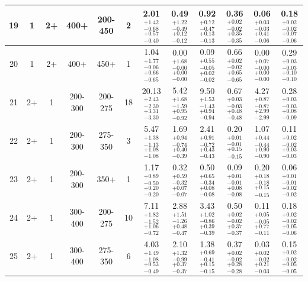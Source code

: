 \begin{landscape}
\begin{table}[hp]
\begin{lrbox}{\resBox}
\begin{tabular}{|c|c|c|c|c||c|c||c|c|c|c|c|}
 \hline
             19 &               1 &              2+ &            400+ &         200-450  &      2 &   2.01 $^{+1.42}_{-0.68}$ $^{+0.57}_{-0.40}$ &   0.49 $^{+1.22}_{-0.49}$ $^{+0.12}_{-0.12}$ &   0.92 $^{+0.72}_{-0.47}$ $^{+0.13}_{-0.13}$ &   0.36 $^{+0.02}_{-0.02}$ $^{+0.35}_{-0.35}$ &   0.06 $^{+0.03}_{-0.03}$ $^{+0.41}_{-0.06}$ &   0.18 $^{+0.02}_{-0.02}$ $^{+0.07}_{-0.06}$ \\
 \hline
             20 &               1 &              2+ &            400+ &            450+  &      1 &   1.04 $^{+1.77}_{-0.06}$ $^{+0.66}_{-0.65}$ &   0.00 $^{+1.68}_{-0.00}$ $^{+0.00}_{-0.00}$ &   0.09 $^{+0.55}_{-0.05}$ $^{+0.02}_{-0.02}$ &   0.66 $^{+0.02}_{-0.02}$ $^{+0.65}_{-0.65}$ &   0.00 $^{+0.07}_{-0.00}$ $^{+0.00}_{-0.00}$ &   0.29 $^{+0.03}_{-0.03}$ $^{+0.10}_{-0.10}$ \\
 \hline
             21 &              2+ &               1 &         200-300 &         200-275  &     18 &  20.13 $^{+2.43}_{-2.30}$ $^{+3.31}_{-3.30}$ &   5.42 $^{+1.68}_{-1.59}$ $^{+0.95}_{-0.92}$ &   9.50 $^{+1.53}_{-1.43}$ $^{+0.94}_{-0.94}$ &   0.67 $^{+0.03}_{-0.03}$ $^{+0.48}_{-0.48}$ &   4.27 $^{+0.87}_{-0.87}$ $^{+2.99}_{-2.99}$ &   0.28 $^{+0.03}_{-0.03}$ $^{+0.08}_{-0.09}$ \\
 \hline
             22 &              2+ &               1 &         200-300 &         275-350  &      3 &   5.47 $^{+1.38}_{-1.13}$ $^{+1.08}_{-1.08}$ &   1.69 $^{+0.94}_{-0.74}$ $^{+0.40}_{-0.39}$ &   2.41 $^{+0.91}_{-0.72}$ $^{+0.43}_{-0.43}$ &   0.20 $^{+0.01}_{-0.01}$ $^{+0.15}_{-0.15}$ &   1.07 $^{+0.44}_{-0.44}$ $^{+0.90}_{-0.90}$ &   0.11 $^{+0.02}_{-0.02}$ $^{+0.03}_{-0.03}$ \\
 \hline
             23 &              2+ &               1 &         200-300 &            350+  &      1 &   1.17 $^{+0.89}_{-0.50}$ $^{+0.20}_{-0.20}$ &   0.32 $^{+0.59}_{-0.32}$ $^{+0.07}_{-0.07}$ &   0.50 $^{+0.65}_{-0.34}$ $^{+0.08}_{-0.08}$ &   0.09 $^{+0.01}_{-0.01}$ $^{+0.08}_{-0.08}$ &   0.20 $^{+0.18}_{-0.18}$ $^{+0.15}_{-0.15}$ &   0.06 $^{+0.01}_{-0.01}$ $^{+0.02}_{-0.02}$ \\
 \hline
             24 &              2+ &               1 &         300-400 &         200-275  &     10 &   7.11 $^{+1.82}_{-1.52}$ $^{+1.06}_{-0.72}$ &   2.88 $^{+1.51}_{-1.26}$ $^{+0.48}_{-0.47}$ &   3.43 $^{+1.02}_{-0.86}$ $^{+0.39}_{-0.39}$ &   0.50 $^{+0.02}_{-0.02}$ $^{+0.37}_{-0.37}$ &   0.11 $^{+0.05}_{-0.05}$ $^{+0.77}_{-0.11}$ &   0.18 $^{+0.02}_{-0.02}$ $^{+0.05}_{-0.06}$ \\
 \hline
             25 &              2+ &               1 &         300-400 &         275-350  &      6 &   4.03 $^{+1.49}_{-1.08}$ $^{+0.53}_{-0.49}$ &   2.10 $^{+1.32}_{-0.99}$ $^{+0.37}_{-0.37}$ &   1.38 $^{+0.69}_{-0.41}$ $^{+0.15}_{-0.15}$ &   0.37 $^{+0.02}_{-0.02}$ $^{+0.28}_{-0.28}$ &   0.03 $^{+0.02}_{-0.02}$ $^{+0.21}_{-0.03}$ &   0.15 $^{+0.02}_{-0.02}$ $^{+0.05}_{-0.05}$ \\

\end{tabular}
\end{lrbox}
\end{table}
\end{landscape}
